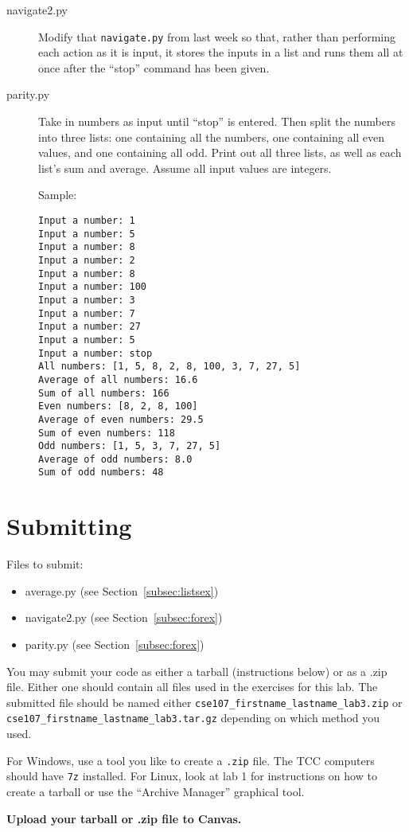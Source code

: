 \documentclass[11pt]{cselabheader}
\begin{document}
\begin{description}
  \item[navigate2.py] Modify that \lstinline{navigate.py} from last week so that, rather than performing each action as it is input, it stores the inputs in a list and runs them all at once after the ``stop'' command has been given.
  \item[parity.py] Take in numbers as input until ``stop'' is entered. Then split the numbers into three lists: one containing all the numbers, one containing all even values, and one containing all odd. Print out all three lists, as well as each list's sum and average. Assume all input values are integers.

    Sample:
\begin{lstlisting}[style=ipython]
Input a number: 1
Input a number: 5
Input a number: 8
Input a number: 2
Input a number: 8
Input a number: 100
Input a number: 3
Input a number: 7
Input a number: 27
Input a number: 5
Input a number: stop
All numbers: [1, 5, 8, 2, 8, 100, 3, 7, 27, 5]
Average of all numbers: 16.6
Sum of all numbers: 166
Even numbers: [8, 2, 8, 100]
Average of even numbers: 29.5
Sum of even numbers: 118
Odd numbers: [1, 5, 3, 7, 27, 5]
Average of odd numbers: 8.0
Sum of odd numbers: 48
\end{lstlisting}
\end{description}

\pagebreak
\section{Submitting}

Files to submit:
\begin{itemize}
  \item average.py (see Section~\ref{subsec:listsex})
  \item navigate2.py (see Section~\ref{subsec:forex})
  \item parity.py (see Section~\ref{subsec:forex})
\end{itemize}

You may submit your code as either a tarball (instructions below) or as a .zip
file. Either one should contain all files used in the exercises for this lab.
The submitted file should be named either
\texttt{cse107\_firstname\_lastname\_lab3.zip} or
\texttt{cse107\_firstname\_lastname\_lab3.tar.gz} depending on which method you
used.

For Windows, use a tool you like to create a \texttt{.zip} file. The TCC computers should
have \texttt{7z} installed. For Linux, look at lab 1 for instructions on how to
create a tarball or use the ``Archive Manager'' graphical tool.

\begin{center}
  \textbf{Upload your tarball or .zip file to Canvas.}
\end{center}
\end{document}
